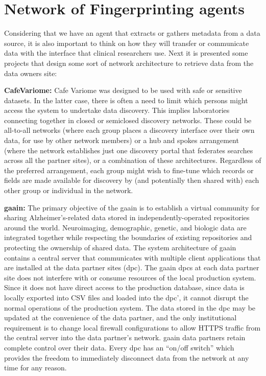 \section{Network of Fingerprinting agents}

Considering that we have an agent that extracts or gathers metadata from a data source,
it is also important to think on how they will transfer or communicate data with the
interface that clinical researchers use.
Next it is presented some projects that design some sort of network architecture to
retrieve data from the data owners site:

\textbf{CafeVariome\cite{cafevariome}: }
Cafe Variome was designed to be used with safe or sensitive datasets.
In the latter case, there is often a need to limit which persons might access the
system to undertake data discovery.
This implies laboratories connecting together in closed or semiclosed discovery
networks.
These could be all-to-all networks (where each group places a discovery interface over
their own data, for use by other network members) or a hub and spokes arrangement
(where the network establishes just one discovery portal that federates searches across
all the partner sites), or a combination of these architectures.
Regardless of the preferred arrangement, each group might wish to fine-tune which
records or fields are made available for discovery by (and potentially then shared
with) each other group or individual in the network.

\textbf{\gls{gaain}\cite{gaain}:}
The primary objective of the \gls{gaain}
is to establish a virtual community for sharing Alzheimer's-related data stored in
independently-operated repositories around the world.
Neuroimaging, demographic, genetic, and biologic data are integrated together while
respecting the boundaries of existing repositories and protecting the ownership of
shared data.
The system architecture of \gls{gaain} contains a central server that communicates with
multiple client applications that are installed at the data partner sites (\gls{dpc}).
The \gls{gaain} \gls{dpc}s at each data partner site does not interfere with or consume
resources of the local production system.
Since it does not have direct access to the production database, since data is locally
exported into CSV files and loaded into the \gls{dpc}', it cannot disrupt
the normal operations of the production system.
The data stored in the \gls{dpc} may be updated at the convenience of the data partner,
and the only institutional requirement is to change local firewall configurations to
allow HTTPS traffic from the central server into the data partner's network.
\gls{gaain} data partners retain complete control over their data.
Every \gls{dpc} has an “on/off switch” which provides the freedom to immediately
disconnect data from the network at any time for any reason.


